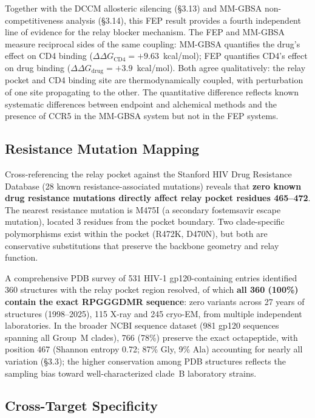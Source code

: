 \documentclass[11pt,a4paper]{article}
\begin{document}
Together with the DCCM allosteric silencing (\S3.13) and MM-GBSA non-competitiveness analysis (\S3.14), this FEP result provides a fourth independent line of evidence for the relay blocker mechanism. The FEP and MM-GBSA measure reciprocal sides of the same coupling: MM-GBSA quantifies the drug's effect on CD4 binding ($\Delta\Delta G_\mathrm{CD4} = +9.63$~kcal/mol); FEP quantifies CD4's effect on drug binding ($\Delta\Delta G_\mathrm{drug} = +3.9$~kcal/mol). Both agree qualitatively: the relay pocket and CD4 binding site are thermodynamically coupled, with perturbation of one site propagating to the other. The quantitative difference reflects known systematic differences between endpoint and alchemical methods \citep{Genheden2015} and the presence of CCR5 in the MM-GBSA system but not in the FEP systems.

\subsection{Resistance Mutation Mapping}

Cross-referencing the relay pocket against the Stanford HIV Drug Resistance Database (28 known resistance-associated mutations) reveals that \textbf{zero known drug resistance mutations directly affect relay pocket residues 465--472}. The nearest resistance mutation is M475I (a secondary fostemsavir escape mutation), located 3 residues from the pocket boundary. Two clade-specific polymorphisms exist within the pocket (R472K, D470N), but both are conservative substitutions that preserve the backbone geometry and relay function.

A comprehensive PDB survey of 531 HIV-1 gp120-containing entries identified 360 structures with the relay pocket region resolved, of which \textbf{all 360 (100\%) contain the exact RPGGGDMR sequence}: zero variants across 27 years of structures (1998--2025), 115 X-ray and 245 cryo-EM, from multiple independent laboratories. In the broader NCBI sequence dataset (981 gp120 sequences spanning all Group~M clades), 766 (78\%) preserve the exact octapeptide, with position 467 (Shannon entropy 0.72; 87\% Gly, 9\% Ala) accounting for nearly all variation (\S3.3); the higher conservation among PDB structures reflects the sampling bias toward well-characterized clade~B laboratory strains.

\subsection{Cross-Target Specificity}
\end{document}
